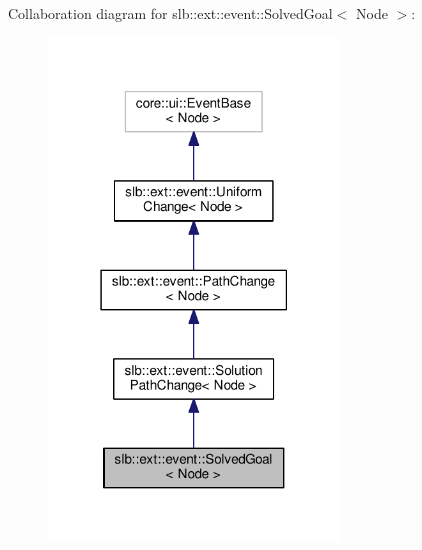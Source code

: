 Collaboration diagram for slb\+:\+:ext\+:\+:event\+:\+:Solved\+Goal$<$ Node $>$\+:\nopagebreak
\begin{figure}[H]
\begin{center}
\leavevmode
\includegraphics[width=219pt]{structslb_1_1ext_1_1event_1_1SolvedGoal__coll__graph}
\end{center}
\end{figure}
